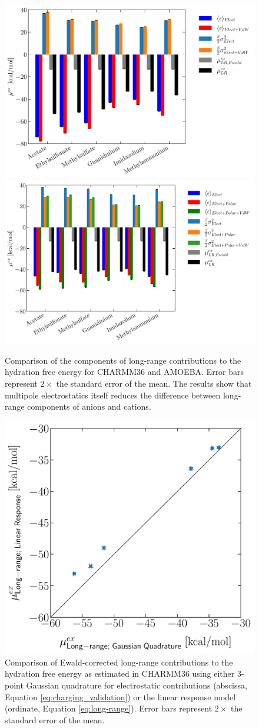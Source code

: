 \documentclass[journal=jacsat,articletitle=true,manuscript=suppinfo,layout=onecolumn]{achemso}
\begin{document}
    \begin{figure}[H]
    \begin{center}
        \includegraphics[width=0.49\columnwidth]{CEX/images/long_range_charmm.pdf}
        \includegraphics[width=0.49\columnwidth]{CEX/images/long_range_amoeba.pdf}
        \caption{Comparison of the components of long-range contributions to the hydration free energy for CHARMM36 and AMOEBA. Error bars represent $2\times$ the standard error of the mean. The results show that multipole electrostatics itself reduces the difference between long-range components of anions and cations. }
        \label{fig:long_range_compare}
    \end{center}
    \end{figure}
    
    \begin{figure}[H]
    \begin{center}
        \includegraphics[width=0.7\columnwidth]{images/long_range_method_parity.pdf}
        \caption{Comparison of Ewald-corrected long-range contributions to the hydration free energy as estimated in CHARMM36 using either 3-point Gaussian quadrature for electrostatic contributions (abscissa, Equation \ref{eq:charging_validation}) or the linear response model (ordinate, Equation \ref{eq:long-range}). Error bars represent $2\times$ the standard error of the mean.}
        \label{fig:long_range_method_parity}
    \end{center}
    \end{figure}
\end{document}
